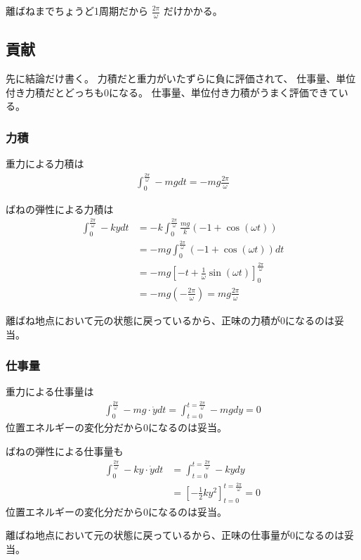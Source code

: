 \documentclass[a4paper,11pt]{jsarticle}
\begin{document}
離ばねまでちょうど1周期だから
$\frac{2\pi}{\omega}$
だけかかる。

\subsection{貢献}
先に結論だけ書く。
力積だと重力がいたずらに負に評価されて、
仕事量、単位付き力積だとどっちも0になる。
仕事量、単位付き力積がうまく評価できている。

\subsubsection{力積}
重力による力積は
\begin{align}
  \int_0^{\frac{2\pi}{\omega}} -mg dt = -mg \frac{2\pi}{\omega}
\end{align}

ばねの弾性による力積は
\begin{align}
  \int_0^{\frac{2\pi}{\omega}} -ky dt & = -k \int_0^{\frac{2\pi}{\omega}} \frac{mg}{k}\left(-1+\cos(\omega t)\right)
  \\ &= -mg \int_0^{\frac{2\pi}{\omega}} \left(-1+\cos(\omega t)\right) dt
  \\ &= -mg \left[-t+\frac{1}{\omega}\sin(\omega t)\right]_0^{\frac{2\pi}{\omega}}
  \\ &= -mg \left( -\frac{2\pi}{\omega} \right) = mg \frac{2\pi}{\omega}
\end{align}

離ばね地点において元の状態に戻っているから、正味の力積が0になるのは妥当。

\subsubsection{仕事量}
重力による仕事量は
\begin{align}
  \int_0^{\frac{2\pi}{\omega}} -mg\cdot\dot{y} dt = \int_{t=0}^{t=\frac{2\pi}{\omega}} -mg dy = 0
\end{align}
位置エネルギーの変化分だから0になるのは妥当。

ばねの弾性による仕事量も
\begin{align}
  \int_0^{\frac{2\pi}{\omega}} -ky \cdot\dot{y} dt
   & = \int_{t=0}^{t=\frac{2\pi}{\omega}} -kydy
  \\&= \left[-\frac{1}{2}ky^2\right]_{t=0}^{t=\frac{2\pi}{\omega}} = 0
\end{align}
位置エネルギーの変化分だから0になるのは妥当。

離ばね地点において元の状態に戻っているから、正味の仕事量が0になるのは妥当。
\end{document}

